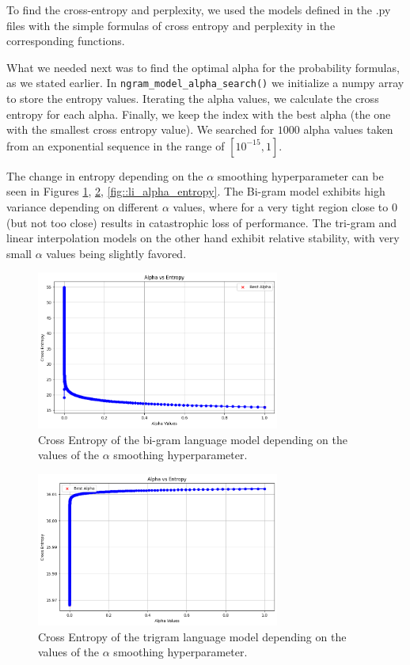\documentclass[11pt, a4paper]{article}
\begin{document}
	To find the cross-entropy and perplexity, we used the models defined in the .py files with the simple formulas of cross entropy and perplexity in the corresponding functions. 
	
	What we needed next was to find the optimal alpha for the probability formulas, as we stated earlier. In \texttt{ngram\_model\_alpha\_search()} we initialize a numpy array to store the entropy values. Iterating the alpha values, we calculate the cross entropy for each alpha. Finally, we keep the index with the best alpha (the one with the smallest cross entropy value). We searched for $1000$ alpha values taken from an exponential sequence in the range of $[10^{-15}, 1]$.
	
	The change in entropy depending on the $\alpha$ smoothing hyperparameter can be seen in Figures \ref{fig::bi_alpha_entropy}, \ref{fig::tri_alpha_entropy}, \ref{fig::li_alpha_entropy}. The Bi-gram model exhibits high variance depending on different $\alpha$ values, where for a very tight region close to 0 (but not too close) results in catastrophic loss of performance. The tri-gram and linear interpolation models on the other hand exhibit relative stability, with very small $\alpha$ values being slightly favored.
	

	 \begin{figure}
	    \centering
	    \includegraphics[width=8cm]{"bi_alpha.png"}
	    \caption{Cross Entropy of the bi-gram language model depending on the values of the $\alpha$ smoothing hyperparameter.}
	    \label{fig::bi_alpha_entropy}
	\end{figure}

	\begin{figure}
		\centering
		\includegraphics[width=8cm]{"tri_alpha.png"}
		\caption{Cross Entropy of the trigram language model depending on the values of the $\alpha$ smoothing hyperparameter.}
		\label{fig::tri_alpha_entropy}
	\end{figure}
	
\end{document}
